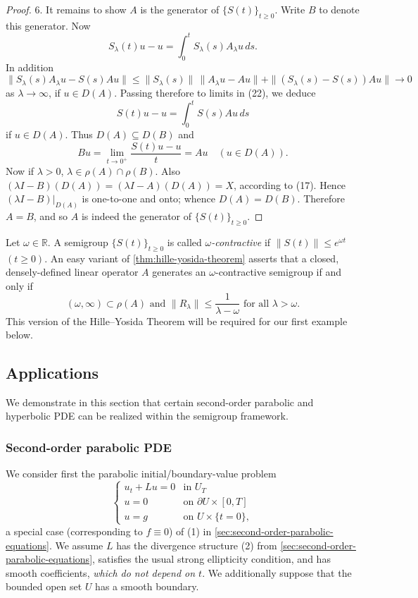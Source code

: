 \begin{proof}
6. It remains to show $A$ is the generator of $\{S(t)\}_{t \ge 0}$. Write $B$ to denote this generator. Now
\[
S_\lambda(t)u - u = \int_0^t S_\lambda(s)A_\lambda u\,ds.
\tag{22}
\]
In addition
\[
\|S_\lambda(s)A_\lambda u - S(s)Au\| \le \|S_\lambda(s)\|\,\|A_\lambda u - Au\| + \|(S_\lambda(s) - S(s))Au\| \to 0
\]
as $\lambda \to \infty$, if $u \in D(A)$. Passing therefore to limits in (22), we deduce
\[
S(t)u - u = \int_0^t S(s)Au\,ds
\]
if $u \in D(A)$. Thus $D(A) \subseteq D(B)$ and
\[
Bu = \lim_{t \to 0^+} \frac{S(t)u - u}{t} = Au \quad (u \in D(A)).
\]
Now if $\lambda > 0$, $\lambda \in \rho(A) \cap \rho(B)$. Also $(\lambda I - B)(D(A)) = (\lambda I - A)(D(A)) = X$, according to (17). Hence $(\lambda I - B)|_{D(A)}$ is one-to-one and onto; whence $D(A) = D(B)$. Therefore $A = B$, and so $A$ is indeed the generator of $\{S(t)\}_{t \ge 0}$.
\end{proof}

\begin{remark}
\label{rem:omega-contractive-semigroup}
Let $\omega \in \mathbb{R}$. A semigroup $\{S(t)\}_{t \ge 0}$ is called \textit{$\omega$-contractive} if $\|S(t)\| \le e^{\omega t}$ $(t \ge 0)$. An easy variant of \cref{thm:hille-yosida-theorem} asserts that a closed, densely-defined linear operator $A$ generates an $\omega$-contractive semigroup if and only if
\[
(\omega, \infty) \subset \rho(A) \text{ and } \|R_\lambda\| \le \frac{1}{\lambda - \omega} \text{ for all } \lambda > \omega.
\tag{23}
\]
This version of the Hille--Yosida Theorem will be required for our first example below.
\end{remark}

\subsection{Applications}

We demonstrate in this section that certain second-order parabolic and hyperbolic PDE can be realized within the semigroup framework.

\subsubsection{Second-order parabolic PDE}

We consider first the parabolic initial/boundary-value problem
\[
\begin{cases}
u_t + Lu = 0 & \text{in } U_T \\
u = 0 & \text{on } \partial U \times [0,T] \\
u = g & \text{on } U \times \{t = 0\},
\end{cases}
\tag{24}
\]
a special case (corresponding to $f \equiv 0$) of (1) in \cref{sec:second-order-parabolic-equations}. We assume $L$ has the divergence structure (2) from \cref{sec:second-order-parabolic-equations}, satisfies the usual strong ellipticity condition, and has smooth coefficients, \textit{which do not depend on $t$}. We additionally suppose that the bounded open set $U$ has a smooth boundary.

